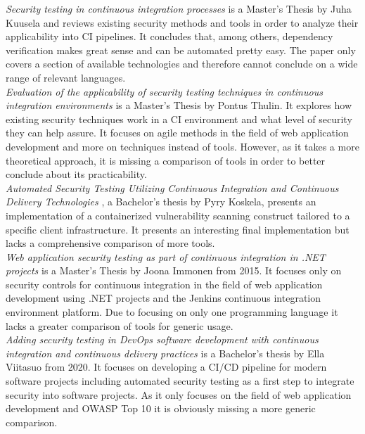 \documentclass[conference]{IEEEtran}
\begin{document}
\noindent
\textit{Security testing in continuous integration processes} \cite{relatedpaper1} is a Master’s Thesis by Juha Kuusela and reviews existing security methods and tools in order to analyze their applicability into CI pipelines. It concludes that, among others, dependency verification makes great sense and can be automated pretty easy. The paper only covers a section of available technologies and therefore cannot conclude on a wide range of relevant languages.\\
 
\noindent
\textit{Evaluation of the applicability of security testing techniques in continuous integration environments} \cite{relatedpaper2} is a Master’s Thesis by Pontus Thulin. It explores how existing security techniques work in a CI environment and what level of security they can help assure. It focuses on agile methods in the field of web application development and more on techniques instead of tools. However, as it takes a more theoretical approach, it is missing a comparison of tools in order to better conclude about its practicability. \\

\noindent
\textit{Automated Security Testing Utilizing Continuous Integration and Continuous Delivery Technologies} \cite{relatedpaper3}, a Bachelor’s thesis by Pyry Koskela, presents an implementation of a containerized vulnerability scanning construct tailored to a specific client infrastructure. It presents an interesting final implementation but lacks a comprehensive comparison of more tools. \\

\noindent
\textit{Web application security testing as part of continuous integration in .NET projects} \cite{relatedpaper4} is a Master’s Thesis by Joona Immonen from 2015. It focuses only on security controls for continuous integration in the field of web application development using .NET projects and the Jenkins continuous integration environment platform. Due to focusing on only one programming language it lacks a greater comparison of tools for generic usage. \\

\noindent
\textit{Adding security testing in DevOps software development with continuous integration and continuous delivery practices} \cite{relatedpaper5} is a Bachelor’s thesis by Ella Viitasuo from 2020. It focuses on developing a CI/CD pipeline for modern software projects including automated security testing as a first step to integrate security into software projects. As it only focuses on the field of web application development and OWASP Top 10 it is obviously missing a more generic comparison. \\
\end{document}
